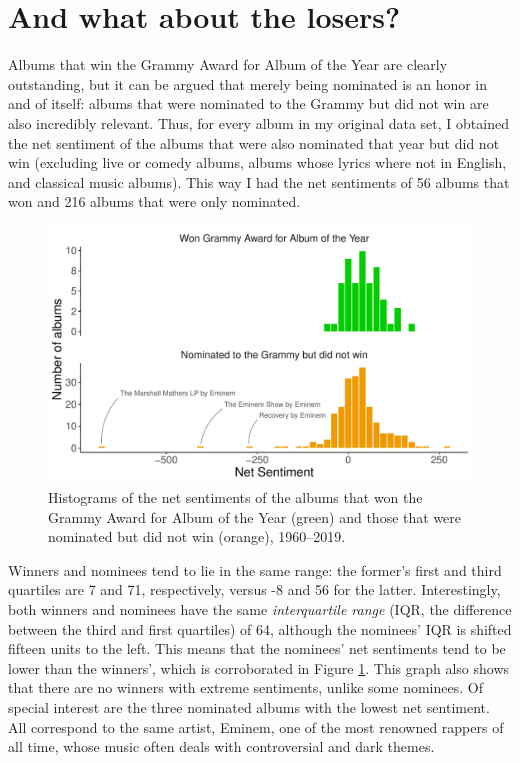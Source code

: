 \documentclass{article}
\begin{document}
\FloatBarrier




\section*{And what about the losers?}


Albums that win the Grammy Award for Album of the Year are clearly outstanding, but it can be argued that merely being nominated is an honor in and of itself: albums that were nominated to the Grammy but did not win are also incredibly relevant. Thus, for every album in my original data set, I obtained the net sentiment of the albums that were also nominated that year but did not win (excluding live or comedy albums, albums whose lyrics where not in English, and classical music albums). This way I had the net sentiments of 56 albums that won and 216 albums that were only nominated. \\





\begin{figure}[h]
    \centering
    \includegraphics[scale=0.6]{Plots/graph_net_sentiment_histogram.pdf}
    \caption{Histograms of the net sentiments of the albums that won the Grammy Award for Album of the Year (green) and those that were nominated but did not win (orange), 1960--2019.}
    \label{fig:histogram}
\end{figure}




Winners and nominees tend to lie in the same range: the former's first and third quartiles are 7 and 71, respectively, versus -8 and 56 for the latter. Interestingly, both winners and nominees have the same \textit{interquartile range} (IQR, the difference between the third and first quartiles) of 64, although the nominees' IQR is shifted fifteen units to the left. This means that the nominees' net sentiments tend to be lower than the winners', which is corroborated in Figure \ref{fig:histogram}. This graph also shows that there are no winners with extreme sentiments, unlike some nominees. Of special interest are the three nominated albums with the lowest net sentiment. All correspond to the same artist, Eminem, one of the most renowned rappers of all time, whose music often deals with controversial and dark themes. \\
\end{document}
